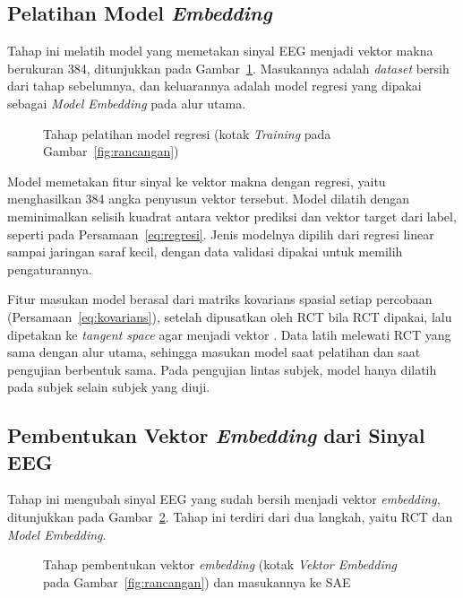 \subsection{Pelatihan Model \textit{Embedding}}
\label{sec:rancangan-pelatihan}
Tahap ini melatih model yang memetakan sinyal EEG menjadi vektor makna berukuran 384, ditunjukkan pada Gambar~\ref{fig:rancangan-pelatihan}.
Masukannya adalah \textit{dataset} bersih dari tahap sebelumnya, dan keluarannya adalah model regresi yang dipakai sebagai \textit{Model Embedding} pada alur utama.

\begin{figure}[H]
  \centering
  
  \caption{Tahap pelatihan model regresi (kotak \textit{Training} pada Gambar~\ref{fig:rancangan})}
  \label{fig:rancangan-pelatihan}
\end{figure}

Model memetakan fitur sinyal ke vektor makna dengan regresi, yaitu menghasilkan 384 angka penyusun vektor tersebut.
Model dilatih dengan meminimalkan selisih kuadrat antara vektor prediksi dan vektor target dari label, seperti pada Persamaan~\ref{eq:regresi}.
Jenis modelnya dipilih dari regresi linear sampai jaringan saraf kecil, dengan data validasi dipakai untuk memilih pengaturannya.

Fitur masukan model berasal dari matriks kovarians spasial setiap percobaan (Persamaan~\ref{eq:kovarians}), setelah dipusatkan oleh RCT bila RCT dipakai, lalu dipetakan ke \textit{tangent space} agar menjadi vektor \parencite{barachant2012}.
Data latih melewati RCT yang sama dengan alur utama, sehingga masukan model saat pelatihan dan saat pengujian berbentuk sama.
Pada pengujian lintas subjek, model hanya dilatih pada subjek selain subjek yang diuji.

\subsection{Pembentukan Vektor \textit{Embedding} dari Sinyal EEG}
\label{sec:rancangan-vektor}
Tahap ini mengubah sinyal EEG yang sudah bersih menjadi vektor \textit{embedding}, ditunjukkan pada Gambar~\ref{fig:rancangan-vektor}.
Tahap ini terdiri dari dua langkah, yaitu RCT dan \textit{Model Embedding}.

\begin{figure}[H]
  \centering
  
  \caption{Tahap pembentukan vektor \textit{embedding} (kotak \textit{Vektor Embedding} pada Gambar~\ref{fig:rancangan}) dan masukannya ke SAE}
  \label{fig:rancangan-vektor}
\end{figure}

